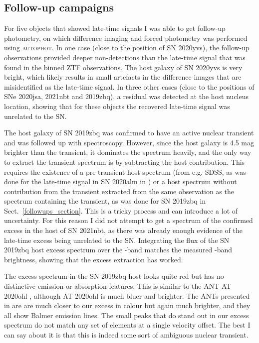 \documentclass[a4paper,oneside,12pt, class=Latex/Classes/PhDthesisPSnPDF, crop=false]{standalone}
\begin{document}
\subsection{Follow-up campaigns}
For five objects that showed late-time signals I was able to get follow-up photometry, on which difference imaging and forced photometry was performed using \textsc{autophot}. In one case (close to the position of SN 2020yvs), the follow-up observations provided deeper non-detections than the late-time signal that was found in the binned ZTF observations. The host galaxy of SN 2020yvs is very bright, which likely results in small artefacts in the difference images that are misidentified as the late-time signal. In three other cases (close to the positions of SNe 2020jsa, 2021nbt and 2019zbq), a residual was detected at the host nucleus location, showing that for these objects the recovered late-time signal was unrelated to the SN. 

The host galaxy of SN 2019zbq was confirmed to have an active nuclear transient and was followed up with spectroscopy. However, since the host galaxy is 4.5 mag brighter than the transient, it dominates the spectrum heavily, and the only way to extract the transient spectrum is by subtracting the host contribution. This requires the existence of a pre-transient host spectrum (from e.g. SDSS, as was done for the late-time signal in SN 2020alm in \citealt{Terwel_2024_paper1}) or a host spectrum without contribution from the transient extracted from the same observation as the spectrum containing the transient, as was done for SN 2019zbq in Sect.~\ref{followups_section}. This is a tricky process and can introduce a lot of uncertainty. For this reason I did not attempt to get a spectrum of the confirmed excess in the host of SN 2021nbt, as there was already enough evidence of the late-time excess being unrelated to the SN. Integrating the flux of the SN 2019zbq host excess spectrum over the \ztfr-band matches the measured \ztfr-band brightness, showing that the excess extraction has worked. 

The excess spectrum in the SN 2019zbq host looks quite red but has no distinctive emission or absorption features. This is similar to the ANT AT 2020ohl \citep{2020ohl_Hinkle}, although AT 2020ohl is much bluer and brighter. The ANTs presented in \citep{wiseman_ztfants} are are much closer to our excess in colour but again much brighter, and they all show Balmer emission lines. The small peaks that do stand out in our excess spectrum do not match any set of elements at a single velocity offset. The best I can say about it is that this is indeed some sort of ambiguous nuclear transient.
\end{document}
